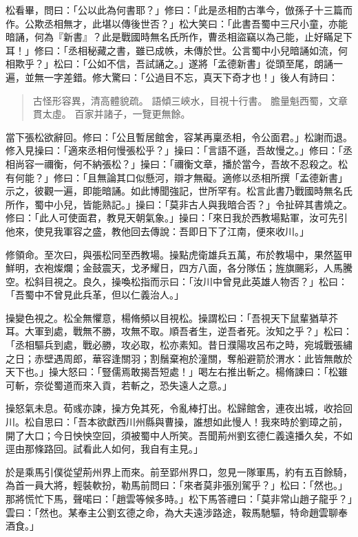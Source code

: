 松看畢，問曰：「公以此為何書耶？」修曰：「此是丞相酌古準今，倣孫子十三篇而作。公欺丞相無才，此堪以傳後世否？」松大笑曰：「此書吾蜀中三尺小童，亦能暗誦，何為『新書』？此是戰國時無名氏所作，曹丞相盜竊以為己能，止好瞞足下耳！」修曰：「丞相秘藏之書，雖已成帙，未傳於世。公言蜀中小兒暗誦如流，何相欺乎？」松曰：「公如不信，吾試誦之。」遂將「孟德新書」從頭至尾，朗誦一遍，並無一字差錯。修大驚曰：「公過目不忘，真天下奇才也！」後人有詩曰：

\begin{quote}
古怪形容異，清高體貌疏。
語傾三峽水，目視十行書。
膽量魁西蜀，文章貫太虛。
百家并諸子，一覽更無餘。
\end{quote}

當下張松欲辭回。修曰：「公且暫居館舍，容某再稟丞相，令公面君。」松謝而退。修入見操曰：「適來丞相何慢張松乎？」操曰：「言語不遜，吾故慢之。」修曰：「丞相尚容一禰衡，何不納張松？」操曰：「禰衡文章，播於當今，吾故不忍殺之。松有何能？」修曰：「且無論其口似懸河，辯才無礙。適修以丞相所撰「孟德新書」示之，彼觀一遍，即能暗誦。如此博聞強記，世所罕有。松言此書乃戰國時無名氏所作，蜀中小兒，皆能熟記。」操曰：「莫非古人與我暗合否？」令扯碎其書燒之。修曰：「此人可使面君，教見天朝氣象。」操曰：「來日我於西教場點軍，汝可先引他來，使見我軍容之盛，教他回去傳說：吾即日下了江南，便來收川。」

修領命。至次曰，與張松同至西教場。操點虎衛雄兵五萬，布於教場中，果然盔甲鮮明，衣袍燦爛；金鼓震天，戈矛耀日，四方八面，各分隊伍；旌旗颺彩，人馬騰空。松斜目視之。良久，操喚松指而示曰：「汝川中曾見此英雄人物否？」松曰：「吾蜀中不曾見此兵革，但以仁義治人。」

操變色視之。松全無懼意，楊脩頻以目視松。操謂松曰：「吾視天下鼠輩猶草芥耳。大軍到處，戰無不勝，攻無不取。順吾者生，逆吾者死。汝知之乎？」松曰：「丞相驅兵到處，戰必勝，攻必取，松亦素知。昔日濮陽攻呂布之時，宛城戰張繡之日；赤壁遇周郎，華容逢關羽；割鬚棄袍於潼關，奪船避箭於渭水：此皆無敵於天下也。」操大怒曰：「豎儒焉敢揭吾短處！」喝左右推出斬之。楊脩諫曰：「松雖可斬，奈從蜀道而來入貢，若斬之，恐失遠人之意。」

操怒氣未息。荀彧亦諫，操方免其死，令亂棒打出。松歸館舍，連夜出城，收拾回川。松自思曰：「吾本欲獻西川州縣與曹操，誰想如此慢人！我來時於劉璋之前，開了大口；今日怏怏空回，須被蜀中人所笑。吾聞荊州劉玄德仁義遠播久矣，不如逕由那條路回。試看此人如何，我自有主見。」

於是乘馬引僕從望荊州界上而來。前至郢州界口，忽見一隊軍馬，約有五百餘騎，為首一員大將，輕裝軟扮，勒馬前問曰：「來者莫非張別駕乎？」松曰：「然也。」那將慌忙下馬，聲喏曰：「趙雲等候多時。」松下馬答禮曰：「莫非常山趙子龍乎？」雲曰：「然也。某奉主公劉玄德之命，為大夫遠涉路途，鞍馬馳驅，特命趙雲聊奉酒食。」

